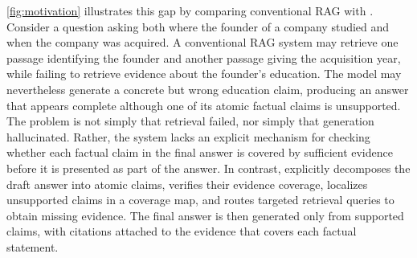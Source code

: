 
\autoref{fig:motivation} illustrates this gap by comparing conventional RAG with \ragname. Consider a question asking both where the founder of a company studied and when the company was acquired. A conventional RAG system may retrieve one passage identifying the founder and another passage giving the acquisition year, while failing to retrieve evidence about the founder's education. The model may nevertheless generate a concrete but wrong education claim, producing an answer that appears complete although one of its atomic factual claims is unsupported. The problem is not simply that retrieval failed, nor simply that generation hallucinated. Rather, the system lacks an explicit mechanism for checking whether each factual claim in the final answer is covered by sufficient evidence before it is presented as part of the answer. In contrast, \ragname explicitly decomposes the draft answer into atomic claims, verifies their evidence coverage, localizes unsupported claims in a coverage map, and routes targeted retrieval queries to obtain missing evidence. The final answer is then generated only from supported claims, with citations attached to the evidence that covers each factual statement.

